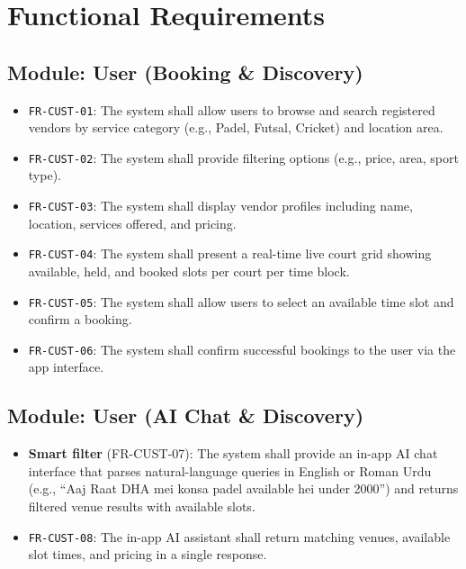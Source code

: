 \section{Functional Requirements}

\subsection{Module: User (Booking \& Discovery)}
\begin{itemize}
  \item \texttt{FR-CUST-01}: The system shall allow users to browse and search registered vendors by service category (e.g., Padel, Futsal, Cricket) and location area.
  \item \texttt{FR-CUST-02}: The system shall provide filtering options (e.g., price, area, sport type).
  \item \texttt{FR-CUST-03}: The system shall display vendor profiles including name, location, services offered, and pricing.
  \item \texttt{FR-CUST-04}: The system shall present a real-time live court grid showing available, held, and booked slots per court per time block.
  \item \texttt{FR-CUST-05}: The system shall allow users to select an available time slot and confirm a booking.
  \item \texttt{FR-CUST-06}: The system shall confirm successful bookings to the user via the app interface.
\end{itemize}

\subsection{Module: User (AI Chat \& Discovery)}
\begin{itemize}
  \item \textbf{Smart filter} (FR-CUST-07): The system shall provide an in-app AI chat interface that parses natural-language queries in English or Roman Urdu (e.g., ``Aaj Raat DHA mei konsa padel available hei under 2000'') and returns filtered venue results with available slots.
  \item \texttt{FR-CUST-08}: The in-app AI assistant shall return matching venues, available slot times, and pricing in a single response.
\end{itemize}

